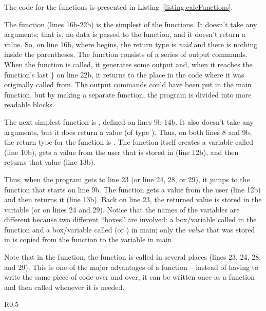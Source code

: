 The code for the functions is presented in Listing~\ref{listing:calcFunctions}.

The  function (lines 16b-22b) is the simplest of the functions.  It doesn't take any arguments; that is, no data is passed to the function, and it doesn't return a value.  So, on line 16b, where  begins, the return type is \emph{void} and there is nothing inside the parentheses.  The function consists of a series of output commands.  When the function is called, it generates some output and, when it reaches the function's last \} on line 22b, it returns to the place in the code where it was originally called from.  The output commands could have been put in the main function, but by making a separate function, the program is divided into more readable blocks.

The next simplest function is , defined on lines 9b-14b.  It also doesn't take any arguments, but it does return a value (of type ).  Thus, on both lines 8 and 9b, the return type for the  function is .  The function itself creates a variable called  (line 10b), gets a value from the user that is stored in  (line  12b), and then returns that value (line 13b).  

Thus, when the program gets to line 23 (or line 24, 28, or 29), it jumps to the  function that starts on line 9b.  The  function gets a value from the user (line 12b) and then returns it (line 13b).  Back on line 23, the returned value is stored in the variable  (or  on lines 24 and 29).  Notice that the names of the variables are different because two different ``boxes'' are involved: a box/variable called  in the function and a box/variable called  (or ) in main; only the \emph{value} that was stored in  is copied from the function to the variable in main.  

Note that in the  function, the  function is called in several places (lines 23, 24, 28, and 29).  This is one of the major advantages of a function -- instead of having to write the same piece of code over and over, it can be written once as a function and then called whenever it is needed.

\begin{wrapfigure}{R}{0.5\textwidth} 
\vspace{-0.5cm}
\end{wrapfigure}

